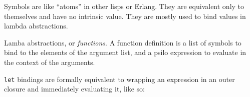 \documentclass[]{article}
\newenvironment{Shaded}{}{}
\newcommand{\KeywordTok}[1]{\textcolor[rgb]{0.00,0.44,0.13}{\textbf{{#1}}}}
\newcommand{\DataTypeTok}[1]{\textcolor[rgb]{0.56,0.13,0.00}{{#1}}}
\newcommand{\DecValTok}[1]{\textcolor[rgb]{0.25,0.63,0.44}{{#1}}}
\newcommand{\StringTok}[1]{\textcolor[rgb]{0.25,0.44,0.63}{{#1}}}
\newcommand{\OtherTok}[1]{\textcolor[rgb]{0.00,0.44,0.13}{{#1}}}
\newcommand{\FunctionTok}[1]{\textcolor[rgb]{0.02,0.16,0.49}{{#1}}}
\newcommand{\NormalTok}[1]{{#1}}
\begin{document}
Symbols are like ``atoms'' in other lisps or Erlang. They are equivalent
only to themselves and have no intrinsic value. They are mostly used to
bind values in lambda abstractions.

\begin{Shaded}
\end{Shaded}

Lamba abstractions, or \emph{functions}. A function definition is a list
of symbols to bind to the elements of the argument list, and a psilo
expression to evaluate in the context of the arguments.

\begin{Shaded}
\end{Shaded}

\texttt{let} bindings are formally equivalent to wrapping an expression
in an outer closure and immediately evaluating it, like so:
\end{document}
